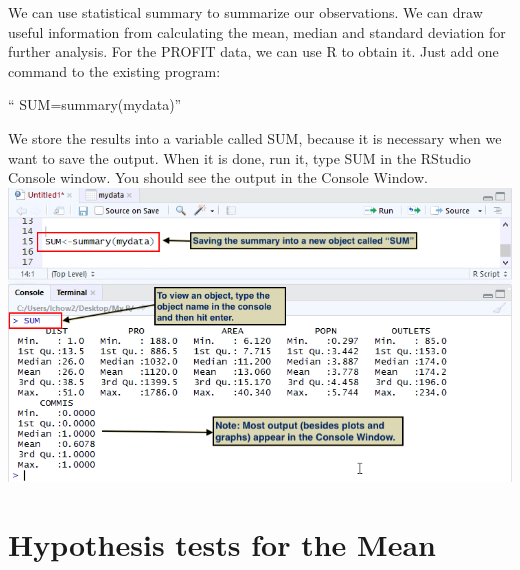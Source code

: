 \documentclass[a4paper]{report}
\begin{document}
        \begin{flushleft}
        We can use statistical summary to summarize our observations. We can draw useful information from calculating the mean, median and standard deviation for further analysis. For the PROFIT data, we can use R to obtain it. Just add one command to the existing program: \begin{center}
            `` SUM=summary(mydata)''
        \end{center}
       
        We store the results into a variable called SUM, because it is necessary when we want to save the output. \newline 
        When it is done, run it, type SUM in the RStudio Console window. You should see the output in the Console Window. 
        \newline \newline
        \includegraphics[width=\textwidth]{images/STATPROP1.png}
        \end{flushleft}
        
    \section{Hypothesis tests for the Mean}
    
\end{document}
